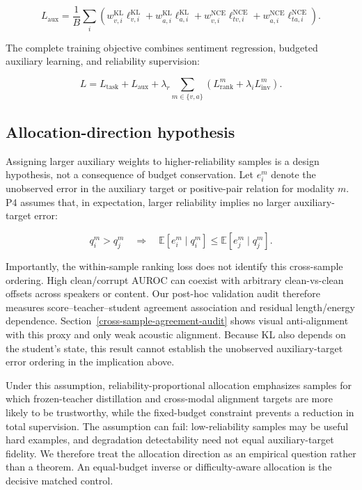 \[
L_{\mathrm{aux}}=
\frac{1}{B}\sum_i\left(
w_{v,i}^{\mathrm{KL}}\ell_{v,i}^{\mathrm{KL}}
+w_{a,i}^{\mathrm{KL}}\ell_{a,i}^{\mathrm{KL}}
+w_{v,i}^{\mathrm{NCE}}\ell_{tv,i}^{\mathrm{NCE}}
+w_{a,i}^{\mathrm{NCE}}\ell_{ta,i}^{\mathrm{NCE}}
\right).
\]

The complete training objective combines sentiment regression, budgeted
auxiliary learning, and reliability supervision:

\[
L=L_{\mathrm{task}}+L_{\mathrm{aux}}
+\lambda_r\sum_{m\in\{v,a\}}
\left(L_{\mathrm{rank}}^m+\lambda_iL_{\mathrm{inv}}^m\right).
\]

\subsection{Allocation-direction
hypothesis}\label{allocation-direction-hypothesis}

Assigning larger auxiliary weights to higher-reliability samples is a design
hypothesis, not a consequence of budget conservation. Let \(e_i^m\) denote
the unobserved error in the auxiliary target or positive-pair relation for
modality \(m\). P4 assumes that, in expectation, larger reliability implies
no larger auxiliary-target error:

\[
q_i^m>q_j^m
\quad\Longrightarrow\quad
\mathbb E[e_i^m\mid q_i^m]\le
\mathbb E[e_j^m\mid q_j^m].
\]

Importantly, the within-sample ranking loss does not identify this cross-sample
ordering. High clean/corrupt AUROC can coexist with arbitrary clean-vs-clean
offsets across speakers or content. Our post-hoc validation audit therefore
measures score--teacher--student agreement association and residual
length/energy dependence. Section~\ref{cross-sample-agreement-audit} shows
visual anti-alignment with this proxy and only weak acoustic alignment.
Because KL also depends on the student's state, this result cannot establish
the unobserved auxiliary-target error ordering in the implication above.

Under this assumption, reliability-proportional allocation emphasizes samples
for which frozen-teacher distillation and cross-modal alignment targets are
more likely to be trustworthy, while the fixed-budget constraint prevents a
reduction in total supervision. The assumption can fail: low-reliability
samples may be useful hard examples, and degradation detectability need not
equal auxiliary-target fidelity. We therefore treat the allocation direction
as an empirical question rather than a theorem. An equal-budget inverse or
difficulty-aware allocation is the decisive matched control.

